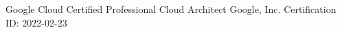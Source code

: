 \awarditem
    {Google Cloud Certified Professional Cloud Architect}
    {Google, Inc.}
    {Certification ID: }
    {2022-02-23}